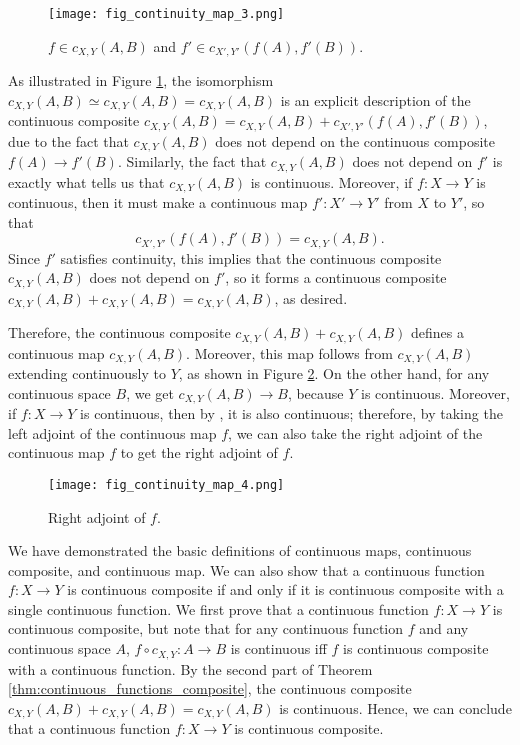 \documentclass[a4paper,reqno,oneside]{article}
\begin{document}
\begin{figure}[ht]
\centering
\texttt{[image: fig\_continuity\_map\_3.png]}
\caption{$f \in c_{X,Y}(A,B)$ and $f' \in c_{X',Y'}(f(A),f'(B))$.}
\label{fig:continuity_map_3}
\end{figure}

As illustrated in Figure \ref{fig:continuity_map_3}, the isomorphism $c_{X,Y}(A,B) \simeq c_{X,Y}(A,B) = c_{X,Y}(A,B)$ is an explicit description of the continuous composite $c_{X,Y}(A,B) = c_{X,Y}(A,B) + c_{X',Y'}(f(A),f'(B))$, due to the fact that $c_{X,Y}(A,B)$ does not depend on the continuous composite $f(A) \to f'(B)$. Similarly, the fact that $c_{X,Y}(A,B)$ does not depend on $f'$ is exactly what tells us that $c_{X,Y}(A,B)$ is continuous. Moreover, if $f: X \to Y$ is continuous, then it must make a continuous map $f': X' \to Y'$ from $X$ to $Y'$, so that
$$c_{X',Y'}(f(A),f'(B)) = c_{X,Y}(A,B).$$
Since $f'$ satisfies continuity, this implies that the continuous composite $c_{X,Y}(A,B)$ does not depend on $f'$, so it forms a continuous composite $c_{X,Y}(A,B) + c_{X,Y}(A,B) = c_{X,Y}(A,B)$, as desired. 

Therefore, the continuous composite $c_{X,Y}(A,B) + c_{X,Y}(A,B)$ defines a continuous map $c_{X,Y}(A,B)$. Moreover, this map follows from $c_{X,Y}(A,B)$ extending continuously to $Y$, as shown in Figure \ref{fig:continuity_map_4}. On the other hand, for any continuous space $B$, we get $c_{X,Y}(A,B) \to B$, because $Y$ is continuous. Moreover, if $f: X \to Y$ is continuous, then by \cite{Wood1976}, it is also continuous; therefore, by taking the left adjoint of the continuous map $f$, we can also take the right adjoint of the continuous map $f$ to get the right adjoint of $f$.

\begin{figure}[ht]
\centering
\texttt{[image: fig\_continuity\_map\_4.png]}
\caption{Right adjoint of $f$.}
\label{fig:continuity_map_4}
\end{figure}

We have demonstrated the basic definitions of continuous maps, continuous composite, and continuous map. We can also show that a continuous function $f: X \to Y$ is continuous composite if and only if it is continuous composite with a single continuous function. We first prove that a continuous function $f: X \to Y$ is continuous composite, but note that for any continuous function $f$ and any continuous space $A$, $f\circ c_{X,Y} : A \to B$ is continuous iff $f$ is continuous composite with a continuous function. By the second part of Theorem \ref{thm:continuous_functions_composite}, the continuous composite $c_{X,Y}(A,B) + c_{X,Y}(A,B) = c_{X,Y}(A,B)$ is continuous. Hence, we can conclude that a continuous function $f: X \to Y$ is continuous composite.
\end{document}
